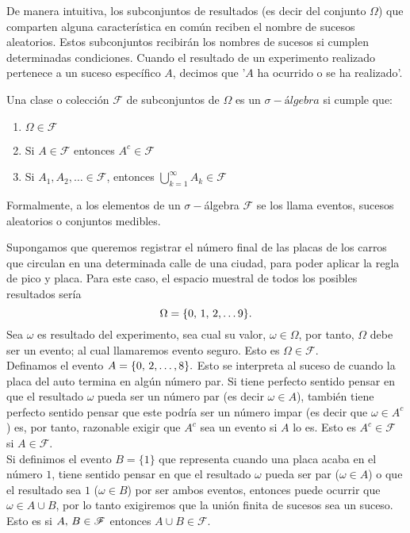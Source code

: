 De manera intuitiva, los subconjuntos de resultados (es decir del conjunto $\Omega$) que comparten alguna característica en común reciben el nombre de sucesos aleatorios.
Estos subconjuntos recibirán los nombres de sucesos si cumplen determinadas condiciones. Cuando el resultado de un experimento realizado pertenece a un suceso específico $A$, decimos que '$A$ ha ocurrido o se ha realizado'.
\begin{Def}
    Una clase o colección $\mathscr{F}$ de subconjuntos de $\Omega$ es un $\sigma- \textit{álgebra}$ si cumple que:
    \begin{enumerate}
        \item $\Omega\in\mathscr{F}$
        \item Si $A\in\mathscr{F}$ entonces $A^c\in\mathscr{F}$
        \item Si $A_1, A_2,\ldots\in\mathscr{F}$, entonces  $\bigcup_{k=1}^\infty A_k\in\mathscr{F}$
    \end{enumerate}
\end{Def}
 Formalmente, a los elementos de un $\sigma-$álgebra $\mathscr{F}$ se los llama eventos, sucesos aleatorios o conjuntos medibles.
\begin{Ejm}
    Supongamos que queremos registrar el número final de las placas de los carros que circulan en una determinada calle de una ciudad, para poder aplicar la regla de pico y placa. Para este caso, el espacio muestral de todos los posibles resultados sería 
    $$\Omega=\{0,\thinspace 1,\thinspace 2,\ldots 9\}.$$
    Sea $\omega$ es resultado del experimento, sea cual su valor, $\omega \in\Omega$, por tanto, $\Omega$ debe ser un evento; al cual llamaremos evento seguro. Esto es $\Omega\in\mathscr{F}.$\\ Definamos el evento $A=\{0,\thinspace 2,\ldots ,8\}.$ Esto se interpreta al suceso de cuando la placa del auto termina en algún número par. Si tiene perfecto sentido pensar en que el resultado $\omega$ pueda ser un número par (es decir $\omega\in A$), también tiene perfecto sentido pensar que este podría ser un número impar (es decir que $\omega \in A^c$) es, por tanto, razonable exigir que $A^c$ sea un evento si $A$ lo es. Esto es $A^c\in\mathscr{F}$ si $A\in\mathscr{F}.$\\Si definimos el evento $B=\{1\}$ que representa cuando una placa acaba en el número $1$, tiene sentido pensar en que el resultado $\omega$ pueda ser par ($\omega\in A$) o que el resultado sea $1$ ($\omega\in B$) por ser ambos eventos, entonces puede ocurrir que $\omega\in A\cup B$, por lo tanto exigiremos que la unión finita de sucesos sea un suceso. Esto es si $A,\thinspace B\in\mathscr{F}$ entonces $A\cup B\in \mathscr{F}.$
\end{Ejm}
